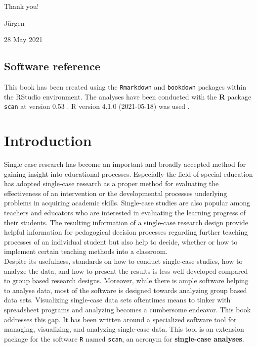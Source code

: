 \documentclass[
]{book}
\begin{document}
Thank you!

Jürgen

28 May 2021

\hypertarget{software-reference}{%
\section*{Software reference}\label{software-reference}}

This book has been created using the \texttt{Rmarkdown} \citep{R-rmarkdown} and \texttt{bookdown} \citep{R-bookdown} packages within the RStudio \citep{RStudio} environment. The analyses have been conducted with the \textbf{R} package \texttt{scan} at version 0.53 \citep{R-scan}. R version 4.1.0 (2021-05-18) was used \citep{R-base}.

\hypertarget{introduction}{%
\chapter{Introduction}\label{introduction}}

Single case research has become an important and broadly accepted method for gaining insight into educational processes. Especially the field of special education has adopted single-case research as a proper method for evaluating the effectiveness of an intervention or the developmental processes underlying problems in acquiring academic skills. Single-case studies are also popular among teachers and educators who are interested in evaluating the learning progress of their students. The resulting information of a single-case research design provide helpful information for pedagogical decision processes regarding further teaching processes of an individual student but also help to decide, whether or how to implement certain teaching methods into a classroom.\\
Despite its usefulness, standards on how to conduct single-case studies, how to analyze the data, and how to present the results is less well developed compared to group based research designs. Moreover, while there is ample software helping to analyse data, most of the software is designed towards analyzing group based data sets. Visualizing single-case data sets oftentimes means to tinker with spreadsheet programs and analyzing becomes a cumbersome endeavor. This book addresses this gap. It has been written around a specialized software tool for managing, visualizing, and analyzing single-case data. This tool is an extension package for the software \texttt{R} \citep{R-base} named \texttt{scan}, an acronym for \textbf{single-case analyses}.
\end{document}

